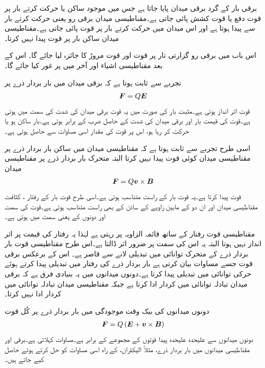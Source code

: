 برقی بار کے گرد برقی میدان پایا جاتا ہے جس میں موجود ساکن یا حرکت کرتے بار پر قوت دفع یا قوت کشش پائی جاتی ہے۔مقناطیسی میدان برقی رو یعنی حرکت کرتے بار سے پیدا ہوتا ہے اور اس میدان میں حرکت کرتے بار پر قوت پائی جاتی ہے۔مقناطیسی میدان ساکن بار پر قوت پیدا نہیں کرتا۔

اس باب میں برقی رو گزارتی تار پر قوت اور قوت مروڑ  کا جائزہ لیا جائے گا۔ اس کے بعد مقناطیسی اشیاء اور آخر میں پر غور کیا جائے گا۔

تجربے سے  ثابت ہوتا ہے کہ برقی میدان میں بار بردار ذرے  پر 
\begin{align}\label{مساوات_امالہ_برقی_قوت}
{\ensuremath{{\boldsymbol{F}}}}=Q {{\boldsymbol{E}}}
\end{align}
قوت اثر انداز ہوتی ہے۔مثبت بار کی صورت میں یہ قوت برقی میدان کی شدت  کی سمت میں ہوتی ہے۔قوت کی قیمت بار  اور برقی میدان کی شدت  کے حاصل ضرب کے برابر ہوتی ہے۔بار ساکن ہو یا حرکت کر رہا ہو، اس پر قوت کی مقدار اسی مساوات سے حاصل ہوتی ہے۔

اسی طرح تجربے سے ثابت ہوتا ہے کہ مقناطیسی میدان میں ساکن بار بردار ذرے  پر مقناطیسی میدان کوئی قوت پیدا نہیں کرتا البتہ متحرک بار بردار ذرے  پر مقناطیسی میدان
\begin{align}\label{مساوات_امالہ_مقناطیسی_قوت}
{\ensuremath{{\boldsymbol{F}}}}=Q {{\boldsymbol{v}}} \times {\ensuremath{{\boldsymbol{B}}}} 
\end{align}
قوت پیدا کرتا ہے۔یہ قوت بار  کے   راست متناسب ہوتی ہے۔اسی طرح قوت بار کے رفتار ،  کثافت مقناطیسی میدان  اور ان دو کے مابین زاویے کے سائن کے بھی  راست متناسب ہوتی ہے۔قوت کی سمت  اور  دونوں کے   یعنی  سمت میں ہوتی ہے۔

مقناطیسی قوت رفتار کے  ساتھ قائمہ الزاویہ   پر رہتی   ہے لہٰذا یہ رفتار کی قیمت پر اثر انداز نہیں ہوتا البتہ یہ اس کی سمت پر ضرور اثر ڈالتا ہے۔اس طرح مقناطیسی قوت بار بردار ذرے کے متحرک توانائی میں تبدیلی لانے سے قاصر ہے۔ اس کے برعکس برقی قوت جسے مساوات  بیان کرتی ہے بار بردار ذرے کی رفتار میں تبدیلی پیدا کرتے ہوئے حرکی توانائی میں تبدیلی پیدا کرتا ہے۔دونوں میدانوں میں یہ بنیادی فرق ہے کہ برقی میدان تبادلہ توانائی میں کردار ادا کرتا ہے جبکہ مقناطیسی میدان تبادلہ توانائی میں کردار ادا نہیں کرتا۔

دونوں میدانوں کی بیک وقت موجودگی میں بار بردار ذرے پر کُل قوت
\begin{align}\label{مساوات_امالہ_لورنز}
{\ensuremath{{\boldsymbol{F}}}}=Q\left({{\boldsymbol{E}}}+{{\boldsymbol{v}}} \times {\ensuremath{{\boldsymbol{B}}}} \right)
\end{align}
دونوں میدانوں سے علیحدہ علیحدہ پیدا قوتوں کے مجموعے کے برابر ہے۔مساوات   کہلاتی ہے۔برقی اور مقناطیسی میدانوں میں بار بردار ذرے، مثلاً الیکٹران، کے راہ اسی مساوات کو حل کرتے ہوئے حاصل کیے جاتے ہیں۔

